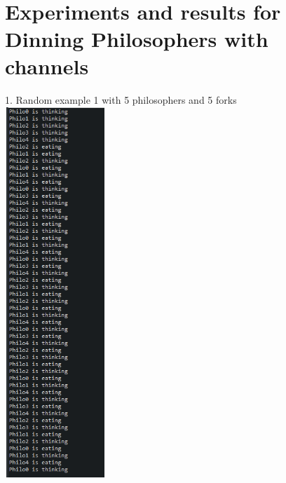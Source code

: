 \documentclass[14pt]{article}
\begin{document}
\vspace{5 mm}\\
\section*{Experiments and results for Dinning Philosophers with channels}
\begin{center}
1. Random example 1 with 5 philosophers and 5 forks\\
\vspace{5mm}
\includegraphics[height=5.5in, width = 1.5in]{philo1.png}\\
\end{center}\\
\end{document}
